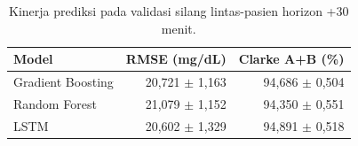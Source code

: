 \begin{table}[!htbp]
    \centering
    \caption{Kinerja prediksi pada validasi silang lintas-pasien horizon +30 menit.}
    \label{tab:tab6.4_kinerja_crossfold_modul_prediksi}
    \begin{tabular}{lrr}
        \hline
        \textbf{Model} & \textbf{RMSE (mg/dL)} & \textbf{Clarke A+B (\%)} \\
        \hline
        Gradient Boosting & 20,721 $\pm$ 1,163 & 94,686 $\pm$ 0,504 \\
        Random Forest & 21,079 $\pm$ 1,152 & 94,350 $\pm$ 0,551 \\
        LSTM & 20,602 $\pm$ 1,329 & 94,891 $\pm$ 0,518 \\
        \hline
    \end{tabular}
\end{table}
